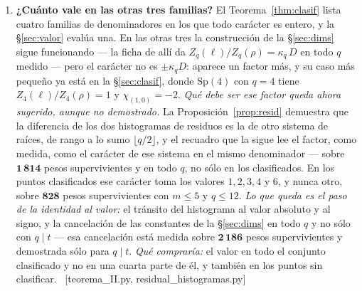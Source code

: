 \documentclass[11pt,a4paper]{article}
\newcommand{\Sp}{\mathrm{Sp}}
\newcommand{\ver}[1]{\unskip\penalty0\ \textcolor{azul}{\small\textsf{[#1]}}}
\begin{document}
\begin{enumerate}\itemsep5pt

\item \textbf{¿Cuánto vale en las otras tres familias?}
El Teorema~\ref{thm:clasif} lista cuatro familias de denominadores en los que todo carácter es
entero, y la \S\ref{sec:valor} evalúa una. En las otras tres la construcción de la
\S\ref{sec:dims} sigue funcionando --- la ficha de allí da $Z_q(\ell)/Z_q(\rho)=\kappa_q\,D$ en
todo $q$ medido --- pero el carácter no es $\pm\kappa_q D$: aparece un factor más, y su caso más
pequeño ya está en la \S\ref{sec:clasif}, donde $\Sp(4)$ con $q=4$ tiene
$Z_4(\ell)/Z_4(\rho)=1$ y $\chi_{(1,0)}=-2$. \emph{Qué debe ser ese factor queda ahora sugerido,
aunque no demostrado.} La Proposición~\ref{prop:resid} demuestra que la diferencia de los dos
histogramas de residuos es la de otro sistema de raíces, de rango a lo sumo $\lfloor q/2\rfloor$,
y el recuadro que la sigue lee el factor, como medida, como el carácter de ese sistema en el mismo denominador --- sobre $\mathbf{1\,814}$
pesos supervivientes y en todo $q$, no sólo en los clasificados. En los puntos clasificados ese
carácter toma los valores $1,2,3,4$ y $6$, y nunca otro, sobre $\mathbf{828}$ pesos supervivientes
con $m\le5$ y $q\le12$. \emph{Lo que queda es el paso de la identidad al valor:} el tránsito del
histograma al valor absoluto y al signo, y la cancelación de las constantes de la \S\ref{sec:dims}
en todo $q$ y no sólo con $q\mid t$ --- esa cancelación está medida sobre $\mathbf{2\,186}$ pesos
supervivientes y demostrada sólo para $q\mid t$. \emph{Qué compraría:} el valor en todo el conjunto
clasificado y no en una cuarta parte de él, y también en los puntos sin clasificar.
\ver{teorema\_II.py, residual\_histogramas.py}


\end{enumerate}
\end{document}
